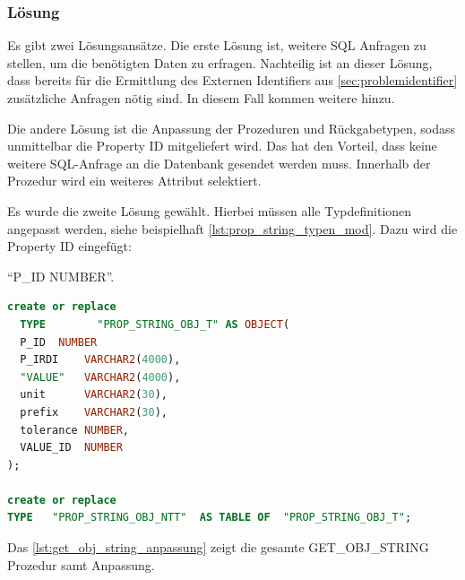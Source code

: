 \subsubsection{Lösung}

Es gibt zwei Lösungsansätze. Die erste Lösung ist, weitere SQL Anfragen zu stellen, um die benötigten Daten zu erfragen. Nachteilig ist an dieser Lösung, dass bereits für die Ermittlung des Externen Identifiers aus \autoref{sec:problemidentifier} zusätzliche Anfragen nötig sind. In diesem Fall kommen weitere hinzu. 

Die andere Lösung ist die Anpassung der Prozeduren und Rückgabetypen, sodass unmittelbar die Property ID mitgeliefert wird. Das hat den Vorteil, dass keine weitere SQL-Anfrage an die Datenbank gesendet werden muss. Innerhalb der Prozedur wird ein weiteres Attribut selektiert. 

Es wurde die zweite Lösung gewählt. Hierbei müssen alle Typdefinitionen angepasst werden, siehe beispielhaft \autoref{lst:prop_string_typen_mod}. Dazu wird die Property ID eingefügt:

\enquote{P\_ID	 NUMBER}.

 \begin{lstlisting}[caption=PROP\_STRING\_OBJ Typanpassung, language=sql, label=lst:prop_string_typen_mod]
create or replace
  TYPE        "PROP_STRING_OBJ_T" AS OBJECT(
  P_ID	NUMBER
  P_IRDI    VARCHAR2(4000),
  "VALUE"   VARCHAR2(4000),
  unit      VARCHAR2(30),
  prefix    VARCHAR2(30),
  tolerance NUMBER,
  VALUE_ID  NUMBER
);

create or replace
TYPE   "PROP_STRING_OBJ_NTT"  AS TABLE OF  "PROP_STRING_OBJ_T";
\end{lstlisting}

Das \autoref{lst:get_obj_string_anpassung} zeigt die gesamte GET\_OBJ\_STRING Prozedur samt Anpassung. 

